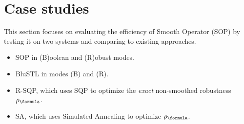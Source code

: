 \section{Case studies}
\label{sec:case study}

This section focuses on evaluating the efficiency of Smooth Operator (SOP) by testing it on two systems and comparing to existing approaches.

\begin{itemize}
	\vspace{-1pt}
	\item SOP in (B)oolean and (R)obust modes.
	\vspace{-1pt}
	\item BluSTL in modes (B) and (R).
	\item R-SQP, which uses SQP to optimize the \textit{exact} non-smoothed robustness $\robf$.
	\vspace{-1pt}
	\item SA, which uses Simulated Annealing to optimize $\robf$.%
	\vspace{-1pt}
\end{itemize}



